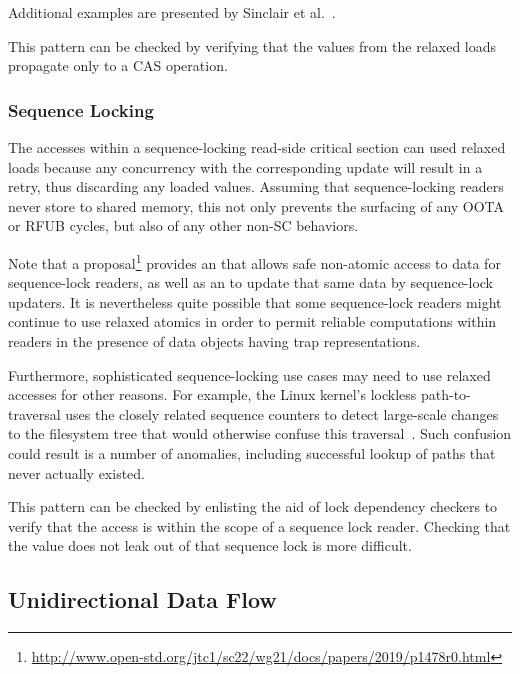 \documentclass[10]{article}
\begin{document}
Additional examples are presented by
Sinclair et al.~\cite{Sinclair:2017:CAR:3079856.3080206}.

This pattern can be checked by verifying that the values from the relaxed
loads propagate only to a CAS operation.

\subsubsection{Sequence Locking}
\label{sec:Sequence Locking}

The accesses within a sequence-locking read-side critical section
can used relaxed loads because any concurrency with the corresponding
update will result in a retry, thus discarding any loaded values.
Assuming that sequence-locking readers never store to shared memory,
this not only prevents the surfacing of any OOTA or RFUB cycles, but
also of any other non-SC behaviors.

Note that a proposal\footnote{
	\url{http://www.open-std.org/jtc1/sc22/wg21/docs/papers/2019/p1478r0.html}}
provides an  that allows safe
non-atomic access to data for sequence-lock readers, as well as an
 to update that same data by
sequence-lock updaters.
It is nevertheless quite possible that some sequence-lock readers
might continue to use relaxed atomics in order to permit reliable
computations within readers in the presence of data objects having
trap representations.

Furthermore, sophisticated sequence-locking use cases may need to
use relaxed accesses for other reasons.
For example, the Linux kernel's lockless path-to- traversal uses
the closely related sequence counters to detect large-scale changes
to the filesystem tree that would otherwise confuse this
traversal~\cite{NeilBrown2015PathnameLookup,NeilBrown2015RCUwalk}.
Such confusion could result is a number of anomalies, including successful
lookup of paths that never actually existed.

This pattern can be checked by enlisting the aid of lock dependency
checkers to verify that the access is within the scope of a sequence
lock reader.
Checking that the value does not leak out of that sequence lock is
more difficult.

\subsection{Unidirectional Data Flow}
\label{sec:Unidirectional Data Flow}
\end{document}
